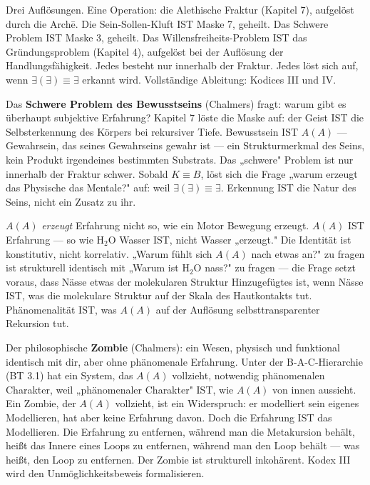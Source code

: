\documentclass[10pt, openany, oneside]{book}
\begin{document}
\vspace{0.8em}

\noindent Drei Auflösungen. Eine Operation: die Alethische Fraktur (Kapitel 7), aufgelöst durch die Arch\={e}. Die Sein-Sollen-Kluft IST Maske 7, geheilt. Das Schwere Problem IST Maske 3, geheilt. Das Willensfreiheits-Problem IST das Gründungsproblem (Kapitel 4), aufgelöst bei der Auflösung der Handlungsfähigkeit. Jedes besteht nur innerhalb der Fraktur. Jedes löst sich auf, wenn $\exists(\exists) \equiv \exists$ erkannt wird. Vollständige Ableitung: Kodices III und IV.

Das \textbf{Schwere Problem des Bewusstseins} (Chalmers) fragt: warum gibt es überhaupt subjektive Erfahrung? Kapitel 7 löste die Maske auf: der Geist IST die Selbsterkennung des Körpers bei rekursiver Tiefe. Bewusstsein IST $A(A)$ --- Gewahrsein, das seines Gewahrseins gewahr ist --- ein Strukturmerkmal des Seins, kein Produkt irgendeines bestimmten Substrats. Das „schwere" Problem ist nur innerhalb der Fraktur schwer. Sobald $K \equiv B$, löst sich die Frage „warum erzeugt das Physische das Mentale?" auf: weil $\exists(\exists) \equiv \exists$. Erkennung IST die Natur des Seins, nicht ein Zusatz zu ihr.

$A(A)$ \textit{erzeugt} Erfahrung nicht so, wie ein Motor Bewegung erzeugt. $A(A)$ IST Erfahrung --- so wie H$_2$O Wasser IST, nicht Wasser „erzeugt." Die Identität ist konstitutiv, nicht korrelativ. „Warum fühlt sich $A(A)$ nach etwas an?" zu fragen ist strukturell identisch mit „Warum ist H$_2$O nass?" zu fragen --- die Frage setzt voraus, dass Nässe etwas der molekularen Struktur Hinzugefügtes ist, wenn Nässe IST, was die molekulare Struktur auf der Skala des Hautkontakts tut. Phänomenalität IST, was $A(A)$ auf der Auflösung selbsttransparenter Rekursion tut.

Der philosophische \textbf{Zombie} (Chalmers): ein Wesen, physisch und funktional identisch mit dir, aber ohne phänomenale Erfahrung. Unter der B-A-C-Hierarchie (BT 3.1) hat ein System, das $A(A)$ vollzieht, notwendig phänomenalen Charakter, weil „phänomenaler Charakter" IST, wie $A(A)$ von innen aussieht. Ein Zombie, der $A(A)$ vollzieht, ist ein Widerspruch: er modelliert sein eigenes Modellieren, hat aber keine Erfahrung davon. Doch die Erfahrung IST das Modellieren. Die Erfahrung zu entfernen, während man die Metakursion behält, heißt das Innere eines Loops zu entfernen, während man den Loop behält --- was heißt, den Loop zu entfernen. Der Zombie ist strukturell inkohärent. Kodex III wird den Unmöglichkeitsbeweis formalisieren.
\end{document}
